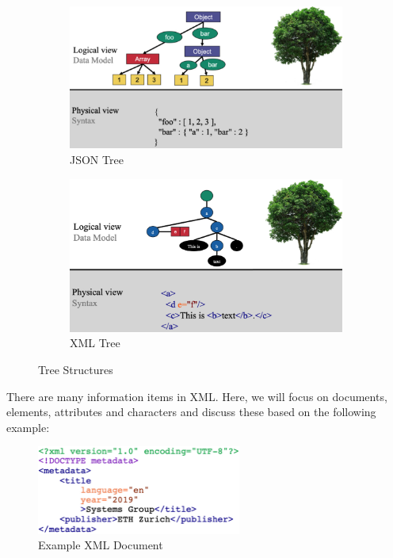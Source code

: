\begin{figure}[h]
    \centering
    \begin{subfigure}{0.495\textwidth}
        \centering
        \includegraphics[width=\textwidth]{Figures/JSONTree.jpeg}
        \caption{JSON Tree}\label{subfig:JSONTree}
    \end{subfigure}
    \hfill
    \begin{subfigure}{0.495\textwidth}
        \centering
        \includegraphics[width=\textwidth]{Figures/XMLTree.jpeg}
        \caption{XML Tree}\label{subfig:XMLTree}
    \end{subfigure}
    \caption{Tree Structures}\label{fig:Trees}
\end{figure}

There are many information items in XML. Here, we will focus on documents, elements, attributes and characters and discuss these based on the following example:

\begin{figure}[h]
    \centering
    \includegraphics[width=0.6\textwidth]{Figures/XMLexplCode.jpeg}
    \caption{Example XML Document}\label{fig:XMLexpl}
\end{figure}

